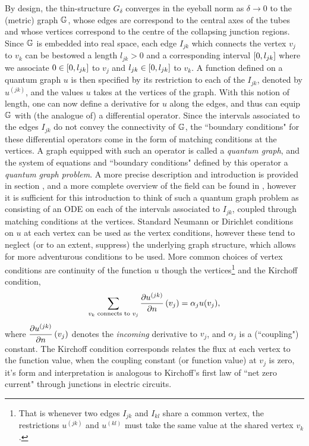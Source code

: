 By design, the thin-structure $G_{\delta}$ converges in the eyeball norm as $\delta\rightarrow0$ to the (metric) graph $\mathbb{G}$, whose edges are correspond to the central axes of the tubes and whose vertices correspond to the centre of the collapsing junction regions.
Since $\mathbb{G}$ is embedded into real space, each edge $I_{jk}$ which connects the vertex $v_j$ to $v_k$ can be bestowed a length $l_{jk}>0$ and a corresponding interval $\left[ 0,l_{jk} \right]$ where we associate $0\in\left[ 0,l_{jk} \right]$ to $v_j$ and $l_{jk}\in\left[ 0,l_{jk} \right]$ to $v_k$.
A function defined on a quantum graph $u$ is then specified by its restriction to each of the $I_{jk}$, denoted by $u^{(jk)}$, and the values $u$ takes at the vertices of the graph.
With this notion of length, one can now define a derivative for $u$ along the edges, and thus can equip $\mathbb{G}$ with (the analogue of) a differential operator.
Since the intervals associated to the edges $I_{jk}$ do not convey the connectivity of $\mathbb{G}$, the ``boundary conditions" for these differential operators come in the form of matching conditions at the vertices.
A graph equipped with such an operator is called a \emph{quantum graph}, and the system of equations and ``boundary conditions" defined by this operator a \emph{quantum graph problem}.
A more precise description and introduction is provided in section , and a more complete overview of the field can be found in \cite{berkolaiko2013introduction}, however it is sufficient for this introduction to think of such a quantum graph problem as consisting of an ODE on each of the intervals associated to $I_{jk}$, coupled through matching conditions at the vertices.
Standard Neumann or Dirichlet conditions on $u$ at each vertex can be used as the vertex conditions, however these tend to neglect (or to an extent, suppress) the underlying graph structure, which allows for more adventurous conditions to be used.
More common choices of vertex conditions are continuity of the function $u$ though the vertices\footnote{That is whenever two edges $I_{jk}$ and $I_{kl}$ share a common vertex, the restrictions $u^{(jk)}$ and $u^{(kl)}$ must take the same value at the shared vertex $v_k$.} and the Kirchoff condition,
\begin{align*}
	\sum_{v_k \text{ connects to } v_j} 
	\dfrac{\partial u^{(jk)}}{\partial n}\left( v_j \right) = \alpha_j u(v_j),
\end{align*}
where $\dfrac{\partial u^{(jk)}}{\partial n}\left( v_j \right)$ denotes the \emph{incoming} derivative to $v_j$, and $\alpha_j$ is a (``coupling") constant. 
The Kirchoff condition corresponds relates the flux at each vertex to the function value, when the coupling constant (or function value) at $v_j$ is zero, it's form and interpretation is analogous to Kirchoff's first law of ``net zero current" through junctions in electric circuits.

